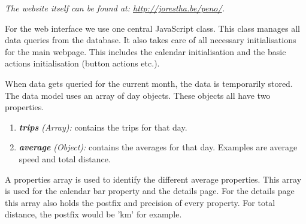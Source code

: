 \textit{The website itself can be found at: \url{http://jorestha.be/peno/}.}

For the web interface we use one central JavaScript class. This class manages all data queries from the database.
It also takes care of all necessary initialisations for the main webpage. This includes the calendar initialisation and
the basic actions initialisation (button actions etc.).

When data gets queried for the current month, the data is temporarily stored. The data
model uses an array of day objects. These objects all have two properties.
\begin{enumerate}
	\item \textit{\textbf{trips} (Array):} contains the trips for that day.
	\item \textit{\textbf{average} (Object):} contains the averages for that day.
	Examples are average speed and total distance.
\end{enumerate}
A properties array is used to identify the different average properties. This array
is used for the calendar bar property and the details page. For the details page this
array also holds the postfix and precision of every property. For total distance, the
postfix would be 'km' for example.
